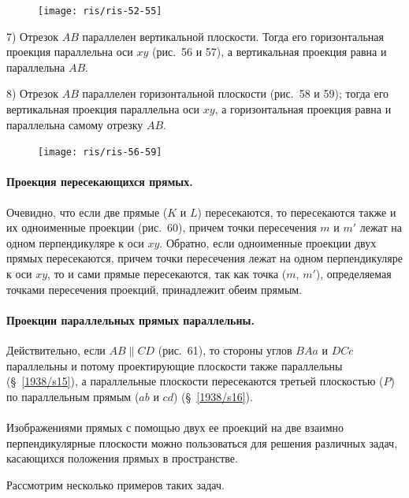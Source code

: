 \documentclass[twoside]{book}
\begin{document}
\begin{figure}[h!]
\centering
\texttt{[image: ris/ris-52-55]}
\caption{}
\end{figure}

7) Отрезок $AB$ параллелен вертикальной плоскости.
Тогда его горизонтальная проекция параллельна оси $xy$ (рис.~56 и 57), а вертикальная проекция равна и параллельна $AB$.

8) Отрезок $AB$ параллелен горизонтальной плоскости (рис.~58 и 59);
тогда его вертикальная проекция параллельна оси $xy$, а горизонтальная проекция равна и параллельна самому отрезку $AB$.

\begin{figure}[h!]
\centering
\texttt{[image: ris/ris-56-59]}
\caption{}
\end{figure}

\paragraph{Проекция пересекающихся прямых.}\label{1938/s58}
Очевидно, что если две прямые ($K$ и $L$) пересекаются, то пересекаются также и их одноименные проекции (рис.~60), причем точки пересечения $m$ и $m'$ лежат на одном перпендикуляре к оси $xy$.
Обратно, если одноименные проекции двух прямых пересекаются, причем точки пересечения лежат на одном перпендикуляре к оси $xy$, то и сами прямые пересекаются, так как точка ($m$, $m'$), определяемая точками пересечения проекций, принадлежит обеим прямым.

\paragraph{Проекции параллельных прямых параллельны.}\label{1938/s59} 
Действительно, если $AB \parallel CD$ (рис.~61), то стороны углов $BAa$ и $DCc$ параллельны и потому проектирующие плоскости также параллельны (§~\ref{1938/s15}), а параллельные плоскости пересекаются третьей плоскостью ($P$) по параллельным прямым ($ab$ и $cd$) (§~\ref{1938/s16}).

\paragraph{}\label{1938/s60}
Изображениями прямых с помощью двух ее проекций на две взаимно перпендикулярные плоскости можно пользоваться для решения различных задач, касающихся положения прямых в пространстве.

Рассмотрим несколько примеров таких задач.
\end{document}
